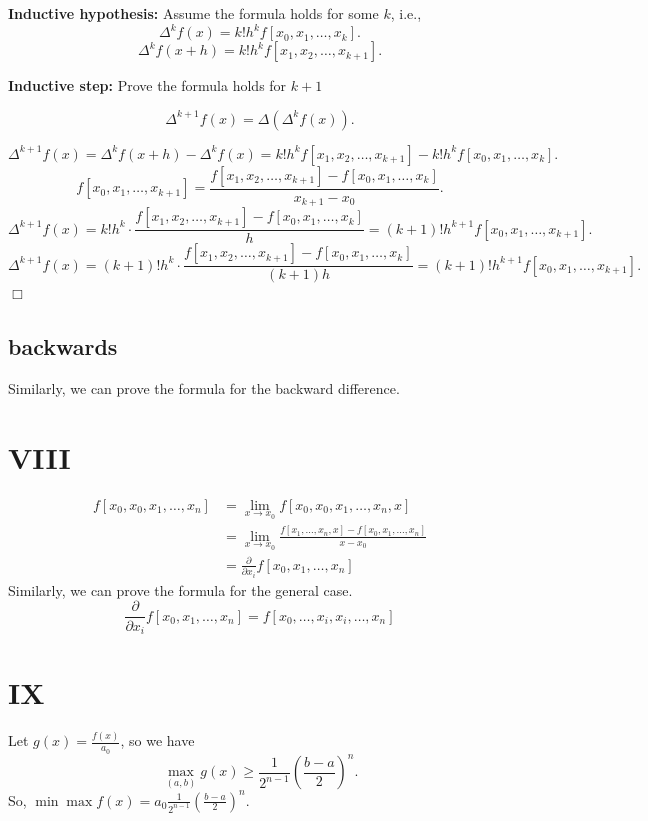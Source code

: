 \documentclass[a4paper]{article}
\begin{document}
\textbf{Inductive hypothesis:} Assume the formula holds for some \( k \), i.e.,
\[
\Delta^k f(x) = k! h^k f[x_0, x_1, \ldots, x_k].
\]
\[
\Delta^k f(x + h) = k! h^k f[x_1, x_2, \ldots, x_{k+1}].
\]

\textbf{Inductive step:} Prove the formula holds for \( k+1 \)

\[
\Delta^{k+1} f(x) = \Delta (\Delta^k f(x)).
\]

\[
\Delta^{k+1} f(x) = \Delta^k f(x + h) - \Delta^k f(x) = k! h^k f[x_1, x_2, \ldots, x_{k+1}] - k! h^k f[x_0, x_1, \ldots, x_k].
\]
\[
f[x_0, x_1, \ldots, x_{k+1}] = \frac{f[x_1, x_2, \ldots, x_{k+1}] - f[x_0, x_1, \ldots, x_k]}{x_{k+1} - x_0}.
\]
\[
\Delta^{k+1} f(x) = k! h^k \cdot \frac{f[x_1, x_2, \ldots, x_{k+1}] - f[x_0, x_1, \ldots, x_k]}{h} = (k+1)! h^{k+1} f[x_0, x_1, \ldots, x_{k+1}].
\]
\[
  \Delta^{k+1} f(x) = (k+1)! h^k \cdot \frac{f[x_1, x_2, \ldots, x_{k+1}] - f[x_0, x_1, \ldots, x_k]}{(k+1)h} = (k+1)! h^{k+1} f[x_0, x_1, \ldots, x_{k+1}].
\] \hfill $\Box$

\subsection*{backwards}
Similarly, we can prove the formula for the backward difference.

\section*{VIII}
\begin{align*}
  f[x_0, x_0, x_1, \ldots, x_n] &= \lim_{x \to x_0} f[x_0, x_0, x_1, \ldots, x_n, x] \\
                                &= \lim_{x \to x_0} \frac{f[x_1, \ldots, x_n, x] - f[x_0, x_1, \ldots, x_n]}{x - x_0} \\
                                &= \frac{\partial}{\partial x_i} f[x_0, x_1, \ldots, x_n]
\end{align*}
Similarly, we can prove the formula for the general case.
\[
\frac{\partial}{\partial x_i} f[x_0, x_1, \ldots, x_n] = f[x_0, \ldots, x_i, x_i, \ldots, x_n]
\]

\section*{IX}
Let $g(x)=\frac{f(x)}{a_0}$, so we have 
\[
  \max _{(a,b)}g(x)\ge \frac{1}{2^{n-1}} (\frac{b-a}{2})^{n}.
\]
So, $\min  \max f(x) = a_0\frac{1}{2^{n-1}} (\frac{b-a}{2})^{n}.$
\end{document}
